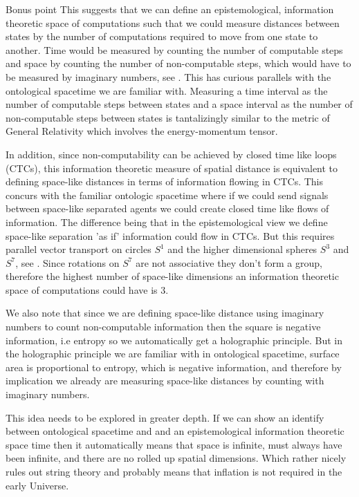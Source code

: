 \documentclass[final]{beamer}
\newlength{\colwidth}
\begin{document}
\begin{frame}[t]
\begin{columns}[t]
\begin{column}{\colwidth}
\begin{block}{Bonus point}
This suggests that we can define an epistemological, information theoretic space of computations such that we could measure distances between states by the number of computations required to move from one state to another. Time would be measured by counting the number of computable steps and space by counting the number of non-computable steps, which would have to be measured by imaginary numbers, see \autocite{small_2006}. This has curious parallels with the ontological spacetime we are familiar with. Measuring a time interval as the number of computable steps between states and a space interval as the number of non-computable steps between states is tantalizingly similar to the metric of General Relativity which involves the energy-momentum tensor.

In addition, since non-computability can be achieved by closed time like loops (CTCs), this information theoretic measure of spatial distance is equivalent to defining space-like distances in terms of information flowing in CTCs. This concurs with the familiar ontologic spacetime where if we could send signals between space-like separated agents we could create closed time like flows of information. The difference being that in the epistemological view we define space-like separation 'as if' information could flow in CTCs. But this requires parallel vector transport on circles $S^1$ and the higher dimensional spheres $S^3$ and $S^7$, see \autocite{baez_2002}. Since rotations on $S^7$ are not associative they don't form a group, therefore the highest number of space-like dimensions an information theoretic space of computations could have is 3. 

We also note that since we are defining space-like distance using imaginary numbers to count non-computable information then the square is negative information, i.e entropy so we automatically get a holographic principle. But in the holographic principle we are familiar with in ontological spacetime, surface area is proportional to entropy, which is negative information, and therefore by implication we already are measuring space-like distances by counting with imaginary numbers.

This idea needs to be explored in greater depth. If we can show an identify between ontological spacetime and and an epistemological information theoretic space time then it automatically means that space is infinite, must always have been infinite, and there are no rolled up spatial dimensions. Which rather nicely rules out string theory and probably means that inflation is not required in the early Universe. 
\end{block}


\end{column}
\end{columns}
\end{frame}
\end{document}
